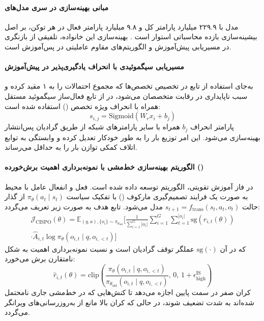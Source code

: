 \item {}

\paragraph*{مبانی بهینه‌سازی در سری مدل‌های }
مدل  با ۲۲۹.۹ میلیارد پارامتر کل و ۹.۸ میلیارد پارامتر فعال در هر توکن، بر اصل بیشینه‌سازی بازده محاسباتی استوار است \cite{minimax2026m2}. بهینه‌سازی این خانواده، تلفیقی از بازنگری در مسیریابی پیش‌آموزش و الگوریتم‌های مقاوم عاملیتی در پس‌آموزش است.

\paragraph*{مسیریابی سیگموئیدی با انحراف یادگیری‌پذیر در پیش‌آموزش}
به‌جای استفاده از تابع  در تخصیص تخصص‌ها که مجموع احتمالات را به ۱ مقید کرده و سبب ناپایداری در رقابت متخصصان می‌شود، در  از تابع فعال‌ساز سیگموئید مستقل همراه با انحراف ویژه تخصص () استفاده شده است:
\begin{equation}
    s_{i,j} = \text{Sigmoid}(W_r x_i + b_j)
\end{equation}
پارامتر انحراف $b_j$ همراه با سایر پارامترهای شبکه از طریق گرادیان پس‌انتشار بهینه‌سازی می‌شود. این امر توزیع بار را به طور خودکار تعدیل کرده و وابستگی به توابع اتلاف کمکی توازن بار را به حداقل می‌رساند.

\paragraph*{الگوریتم بهینه‌سازی خط‌مشی با نمونه‌برداری اهمیت برش‌خورده ()}
در فاز آموزش تقویتی، الگوریتم  \cite{minimax2025m1, minimax2026m2} توسعه داده شده است. فعل و انفعال عامل با محیط به صورت یک فرایند تصمیم‌گیری مارکوف () با تفکیک سیاست $\pi_\theta(a_t \mid s_t)$ از گذار حالت $s_{t+1} = f_{\text{trans}}(s_t, a_t, o_t)$ مدل می‌شود. تابع هدف  به صورت زیر تعریف می‌گردد:
\begin{equation}
\begin{split}
    \mathcal{J}_{\text{CISPO}}(\theta) = \mathbb{E}_{(q, a), \{o_i\} \sim \pi_{\theta_{\text{old}}}} \Bigg[ \frac{1}{\sum_{i=1}^G |o_i|} \sum_{i=1}^G \sum_{t=1}^{|o_i|} \text{sg}\left(\hat{r}_{i,t}(\theta)\right) \\
    \cdot \hat{A}_{i,t} \log \pi_\theta(o_{i,t} \mid q, o_{i,<t}) \Bigg]
\end{split}
\end{equation}
که در آن $\text{sg}(\cdot)$ عملگر توقف گرادیان است و نسبت نمونه‌برداری اهمیت به شکل نامتقارن برش می‌خورد:
\begin{equation}
    \hat{r}_{i,t}(\theta) = \text{clip}\left( \frac{\pi_\theta(o_{i,t} \mid q, o_{i,<t})}{\pi_{\theta_{\text{old}}}(o_{i,t} \mid q, o_{i,<t})}, \, 0, \, 1 + \epsilon_{\text{high}}^{\text{IS}} \right)
\end{equation}
کران صفر در سمت پایین اجازه می‌دهد تا کنش‌هایی که در خط‌مشی جاری نامحتمل شده‌اند به شدت تضعیف شوند، در حالی که کران بالا مانع از به‌روزرسانی‌های ویرانگر می‌گردد.

